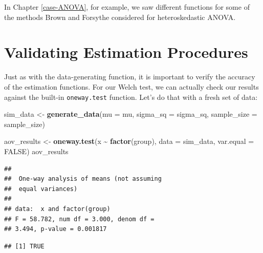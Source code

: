 \documentclass[
]{book}
\newenvironment{Shaded}{\begin{snugshade}}{\end{snugshade}}
\newcommand{\AttributeTok}[1]{\textcolor[rgb]{0.13,0.29,0.53}{#1}}
\newcommand{\ConstantTok}[1]{\textcolor[rgb]{0.56,0.35,0.01}{#1}}
\newcommand{\FunctionTok}[1]{\textcolor[rgb]{0.13,0.29,0.53}{\textbf{#1}}}
\newcommand{\NormalTok}[1]{#1}
\newcommand{\OtherTok}[1]{\textcolor[rgb]{0.56,0.35,0.01}{#1}}
\newcommand{\SpecialCharTok}[1]{\textcolor[rgb]{0.81,0.36,0.00}{\textbf{#1}}}
\begin{document}
In Chapter \ref{case-ANOVA}, for example, we saw different functions for some of the methods Brown and Forsythe considered for heteroskedastic ANOVA.

\section{Validating Estimation Procedures}\label{validating-estimation-procedures}

Just as with the data-generating function, it is important to verify the accuracy of the estimation functions.
For our Welch test, we can actually check our results against the built-in \texttt{oneway.test} function. Let's do that with a fresh set of data:

\begin{Shaded}
\begin{Highlighting}[]
\NormalTok{sim\_data }\OtherTok{\textless{}{-}} \FunctionTok{generate\_data}\NormalTok{(}\AttributeTok{mu =}\NormalTok{ mu, }\AttributeTok{sigma\_sq =}\NormalTok{ sigma\_sq,}
                          \AttributeTok{sample\_size =}\NormalTok{ sample\_size)}

\NormalTok{aov\_results }\OtherTok{\textless{}{-}} \FunctionTok{oneway.test}\NormalTok{(x }\SpecialCharTok{\textasciitilde{}} \FunctionTok{factor}\NormalTok{(group),}
                           \AttributeTok{data =}\NormalTok{ sim\_data, }
                           \AttributeTok{var.equal =} \ConstantTok{FALSE}\NormalTok{)}
\NormalTok{aov\_results}
\end{Highlighting}
\end{Shaded}

\begin{verbatim}
## 
##  One-way analysis of means (not assuming
##  equal variances)
## 
## data:  x and factor(group)
## F = 58.782, num df = 3.000, denom df =
## 3.494, p-value = 0.001817
\end{verbatim}

\begin{Shaded}
\end{Shaded}

\begin{verbatim}
## [1] TRUE
\end{verbatim}
\end{document}
